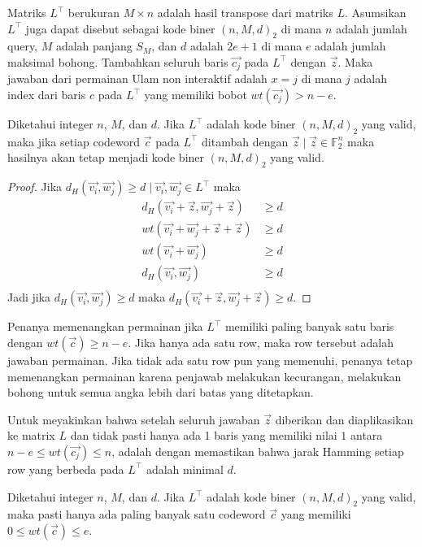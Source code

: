Matriks $L^\top$ berukuran $M \times n$ adalah hasil transpose dari matriks $L$. Asumsikan $L^\top$ juga dapat disebut sebagai kode biner $(n,M,d)_2$ di mana $n$ adalah jumlah query, $M$ adalah panjang $S_M$, dan $d$ adalah $2e+1$ di mana $e$ adalah jumlah maksimal bohong. Tambahkan seluruh baris $\vec{c_j}$ pada $L^\top$ dengan $\vec{z}$. Maka jawaban dari permainan Ulam non interaktif adalah $x = j$ di mana $j$ adalah index dari baris $c$ pada $L^\top$ yang memiliki bobot $wt(\vec{c_j}) > n-e$.

\begin{lemma}
Diketahui integer $n$, $M$, dan $d$. Jika $L^\top$ adalah kode biner $(n,M,d)_2$ yang valid, maka jika setiap codeword $\vec{c}$ pada $L^\top$ ditambah dengan $\vec{z} \mid \vec{z} \in \mathbb{F}_2^n$ maka hasilnya akan tetap menjadi kode biner $(n,M,d)_2$ yang valid.
\end{lemma}

\begin{proof}
Jika $d_H(\vec{v_i},\vec{w_j}) \ge d \mid \vec{v_i},\vec{w_j} \in L^\top$ maka
\begin{align*}
d_H(\vec{v_i}+\vec{z},\vec{w_j}+\vec{z}) &\ge d \\
wt(\vec{v_i}+\vec{w_j}+\vec{z}+\vec{z}) &\ge d \\
wt(\vec{v_i}+\vec{w_j}) &\ge d \\
d_H(\vec{v_i},\vec{w_j}) &\ge d \\
\end{align*}
Jadi jika $d_H(\vec{v_i},\vec{w_j}) \ge d$ maka $d_H(\vec{v_i}+\vec{z},\vec{w_j}+\vec{z}) \ge d$.
\end{proof}

Penanya memenangkan permainan jika $L^\top$ memiliki paling banyak satu baris dengan $wt(\vec{c}) \ge n-e$. Jika hanya ada satu row, maka row tersebut adalah jawaban permainan. Jika tidak ada satu row pun yang memenuhi, penanya tetap memenangkan permainan karena penjawab melakukan kecurangan, melakukan bohong untuk semua angka lebih dari batas yang ditetapkan.

Untuk meyakinkan bahwa setelah seluruh jawaban $\vec{z}$ diberikan dan diaplikasikan ke matrix $L$ dan tidak pasti hanya ada 1 baris yang memiliki nilai $1$ antara $n-e \le wt(\vec{c_j}) \le n$, adalah dengan memastikan bahwa jarak Hamming setiap row yang berbeda pada $L^\top$ adalah minimal $d$.

\begin{lemma}
Diketahui integer $n$, $M$, dan $d$. Jika $L^\top$ adalah kode biner $(n,M,d)_2$ yang valid, maka pasti hanya ada paling banyak satu codeword $\vec{c}$ yang memiliki $0 \le wt(\vec{c}) \le e$.
\end{lemma}

